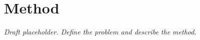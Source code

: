 \section{Method}
\label{sec:method}
\emph{Draft placeholder. Define the problem and describe the method.}
